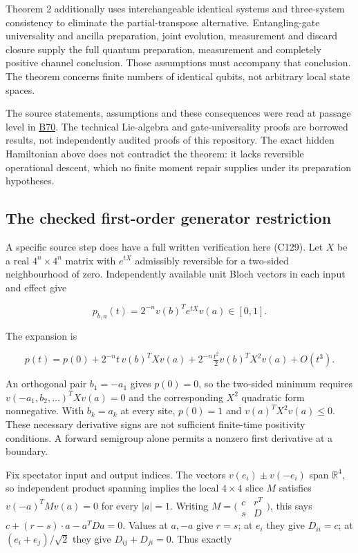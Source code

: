 \documentclass[11pt,a4paper]{article}
\begin{document}
Theorem 2 additionally uses interchangeable identical systems and
three-system consistency to eliminate the partial-transpose alternative.
Entangling-gate universality and ancilla preparation, joint evolution,
measurement and discard closure supply the full quantum preparation,
measurement and completely positive channel conclusion. Those
assumptions must accompany that conclusion. The theorem concerns finite
numbers of identical qubits, not arbitrary local state spaces.

The source statements, assumptions and these consequences were read at
passage level in \href{../references/batches/B70.md}{B70}. The technical
Lie-algebra and gate-universality proofs are borrowed results, not
independently audited proofs of this repository. The exact hidden
Hamiltonian above does not contradict the theorem: it lacks reversible
operational descent, which no finite moment repair supplies under its
preparation hypotheses.

\hypertarget{the-checked-first-order-generator-restriction}{%
\subsection{The checked first-order generator
restriction}\label{the-checked-first-order-generator-restriction}}

A specific source step does have a full written verification here
(C129). Let \(X\) be a real \(4^n\times4^n\) matrix with \(e^{tX}\)
admissibly reversible for a two-sided neighbourhood of zero.
Independently available unit Bloch vectors in each input and effect give

\[p_{b,a}(t)=2^{-n}v(b)^Te^{tX}v(a)\in[0,1].\]

The expansion is

\[p(t)=p(0)+2^{-n}t\,v(b)^TXv(a)
 +2^{-n}\tfrac{t^2}2v(b)^TX^2v(a)+O(t^3).\]

An orthogonal pair \(b_1=-a_1\) gives \(p(0)=0\), so the two-sided
minimum requires \(v(-a_1,b_2,\ldots)^TXv(a)=0\) and the corresponding
\(X^2\) quadratic form nonnegative. With \(b_k=a_k\) at every site,
\(p(0)=1\) and \(v(a)^TX^2v(a)\le0\). These necessary derivative signs
are not sufficient finite-time positivity conditions. A forward
semigroup alone permits a nonzero first derivative at a boundary.

Fix spectator input and output indices. The vectors
\(v(e_i)\pm v(-e_i)\) span \(\mathbb R^4\), so independent product
spanning implies the local \(4\times4\) slice \(M\) satisfies
\(v(-a)^TMv(a)=0\) for every \(|a|=1\). Writing
\(M=\bigl(\begin{smallmatrix}c&r^T\\s&D\end{smallmatrix}\bigr)\), this
says \(c+(r-s)\cdot a-a^TDa=0\). Values at \(a,-a\) give \(r=s\); at
\(e_i\) they give \(D_{ii}=c\); at \((e_i+e_j)/\sqrt2\) they give
\(D_{ij}+D_{ji}=0\). Thus exactly
\end{document}
